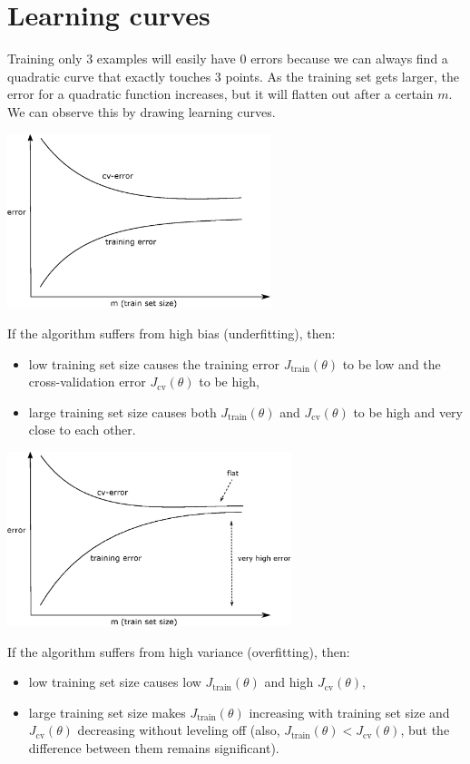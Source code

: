 \documentclass[a4paper,11pt]{report}
\begin{document}
\section{Learning curves}

Training only 3 examples will easily have 0 errors because we can always find a quadratic curve that exactly touches 3 points. As the training set gets larger, the error for a quadratic function increases, but it will flatten  out after a certain $m$. We can observe this by drawing learning curves.
\begin{center}
\includegraphics[height = 2in]{Images/learn_curve}
\end{center}

If the algorithm suffers from high bias (underfitting), then:
\begin{itemize}
  \item low training set size causes the training error $J_\textrm{train}(\theta)$ to be low and the cross-validation error $J_\textrm{cv}(\theta)$ to be high,
  \item large training set size causes both $J_\textrm{train}(\theta)$ and $J_\textrm{cv}(\theta)$ to be high and very close to each other.
\end{itemize}

\begin{center}
\includegraphics[height = 2in]{Images/learn_curve_bias}
\end{center}

If the algorithm suffers from high variance (overfitting), then:
\begin{itemize}
\item low training set size causes low $J_\textrm{train}(\theta)$ and high $J_\textrm{cv}(\theta)$,
\item large training set size makes $J_\textrm{train}(\theta)$ increasing with training set size and $J_\textrm{cv}(\theta)$ decreasing without leveling off (also, $J_\textrm{train}(\theta) < J_\textrm{cv}(\theta)$, but the difference between them remains significant).
\end{itemize}
\end{document}
